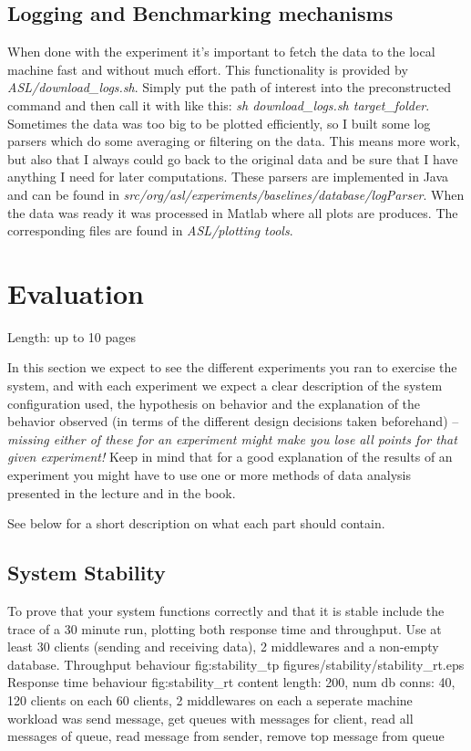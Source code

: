 \documentclass[11pt]{article}
\begin{document}
\subsection{Logging and Benchmarking mechanisms}\label{sec:logging-and-benchmarking-mechanisms}
When done with the experiment it's important to fetch the data to the local machine fast and without much effort. This functionality is provided by \textit{ASL/download\_logs.sh}. Simply put the path of interest into the preconstructed command and then call it with like this: \textit{sh download\_logs.sh target\_folder}. Sometimes the data was too big to be plotted efficiently, so I built some log parsers which do some averaging or filtering on the data. This means more work, but also that I always could go back to the original data and be sure that I have anything I need for later computations. These parsers are implemented in Java and can be found in \textit{src/org/asl/experiments/baselines/database/logParser}. When the data was ready it was processed in Matlab where all plots are produces. The corresponding files are found in \textit{ASL/plotting tools}.

\section{Evaluation}\label{sec:evaluation}

Length: up to 10 pages

In this section we expect to see the different experiments you ran to
exercise the system, and with each experiment we expect a clear
description of the system configuration used, the hypothesis on behavior
and the explanation of the behavior observed (in terms of the different
design decisions taken beforehand) -- \emph{missing either of these for
an experiment might make you lose all points for that given experiment!}
Keep in mind that for a good explanation of the results of an experiment
you might have to use one or more methods of data analysis presented in
the lecture and in the book.

See below for a short description on what each part should contain.

\subsection{System Stability}\label{sec:system-stability}

To prove that your system functions correctly and that it is stable
include the trace of a 30 minute run, plotting both response time and
throughput. Use at least 30 clients (sending and receiving data), 2
middlewares and a non-empty database.
 {Throughput behaviour} {fig:stability_tp}
		{figures/stability/stability_rt.eps} {Response time behaviour} {fig:stability_rt}
content length: 200, num db conns: 40, 120 clients on each 60 clients, 2 middlewares on each a seperate machine
\newline
workload was
send message, get queues with messages for client, read all messages of queue, read message from sender, remove top message from queue
\end{document}
